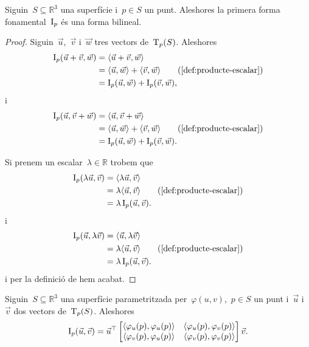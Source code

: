 \documentclass[../../main.tex]{subfiles}
\begin{document}
    \begin{proposition}
        \label{prop:la-primera-forma-fonamental-es-una-forma-bilineal}
        Siguin~\(S\subseteq\mathbb{R}^{3}\) una superfície i~\(p\in S\) un punt.
        Aleshores la primera forma fonamental~\(\I_{p}\) és una forma bilineal.
    \end{proposition}
    \begin{proof}
        Siguin~\(\vec{u}\),~\(\vec{v}\) i~\(\vec{w}\) tres vectors de~\(\operatorname{T}_{p}(S)\).
        Aleshores
        \begin{align*}
            \I_{p}(\vec{u}+\vec{v},\vec{w})&=\prodesc{\vec{u}+\vec{v}}{\vec{w}} \\
            &=\prodesc{\vec{u}}{\vec{w}}+\prodesc{\vec{v}}{\vec{w}} \tag{\ref{def:producte-escalar}}\\
            &=\I_{p}(\vec{u},\vec{w})+\I_{p}(\vec{v},\vec{w}),
        \end{align*}
        i
        \begin{align*}
            \I_{p}(\vec{u},\vec{v}+\vec{w})&=\prodesc{\vec{u}}{\vec{v}+\vec{w}} \\
            &=\prodesc{\vec{u}}{\vec{w}}+\prodesc{\vec{v}}{\vec{w}} \tag{\ref{def:producte-escalar}}\\
            &=\I_{p}(\vec{u},\vec{w})+\I_{p}(\vec{v},\vec{w}).
        \end{align*}

        Si prenem un escalar~\(\lambda\in\mathbb{R}\) trobem que
        \begin{align*}
            \I_{p}(\lambda\vec{u},\vec{v})&=\prodesc{\lambda\vec{u}}{\vec{v}} \\
            &=\lambda\prodesc{\vec{u}}{\vec{v}} \tag{\ref{def:producte-escalar}}\\
            &=\lambda\I_{p}(\vec{u},\vec{v}).
        \end{align*}
        i
        \begin{align*}
            \I_{p}(\vec{u},\lambda\vec{v})&=\prodesc{\vec{u}}{\lambda\vec{v}} \\
            &=\lambda\prodesc{\vec{u}}{\vec{v}} \tag{\ref{def:producte-escalar}}\\
            &=\lambda\I_{p}(\vec{u},\vec{v}).
        \end{align*}
        i per la definició de  hem acabat.
    \end{proof}
    \begin{proposition}
        \label{prop:coeficients-de-la-primera-forma-fonamental}
        Siguin~\(S\subseteq\mathbb{R}^{3}\) una superfície parametritzada per~\(\varphi(u,v)\),~\(p\in S\) un punt i~\(\vec{u}\) i~\(\vec{v}\) dos vectors de~\(\operatorname{T}_{p}(S)\).
        Aleshores
        \[\I_{p}(\vec{u},\vec{v})=\vec{u}^{\transposta}\begin{bmatrix}
            \prodesc{\varphi_{u}(p)}{\varphi_{u}(p)} & \prodesc{\varphi_{u}(p)}{\varphi_{v}(p)} \\
            \prodesc{\varphi_{v}(p)}{\varphi_{u}(p)} & \prodesc{\varphi_{v}(p)}{\varphi_{v}(p)}
        \end{bmatrix}\vec{v}.\]
    \end{proposition}
\end{document}
